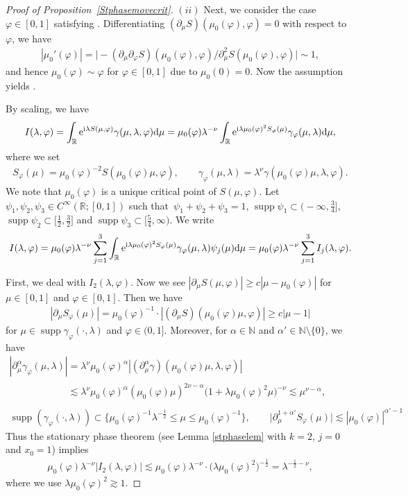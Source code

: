\documentclass[11pt]{article}
\numberwithin{equation}{section}
\def\R{\mathbb{R}}%
\DeclareMathOperator{\supp}{supp}%
\def\a{\alpha}
\def\c{\gamma}
\def\f{\varphi}
\def\g{\psi}
\def\l{\lambda}
\def\m{\mu}
\def\n{\nu}
\def\pa{\partial}
\begin{document}
\begin{proof}[Proof of Proposition~\ref{Stphasemovecrit}]
 $(ii)$ Next, we consider the case $\f\in [0,1]$ satisfying \smash{$\m_0(\f)\in \bigl[ 2^{-1}\l^{-\frac{1}{2}}, 1\bigr]$}.
Differentiating $(\pa_{\m}S)(\m_0(\f),\f)=0$ with respect to $\f$, we have
\begin{align*}
|\m_0'(\f)|=\bigl|-(\pa_{\m}\pa_{\f}S)(\m_0(\f),\f)/\pa_{\m}^2S(\m_0(\f),\f)\bigr|\sim 1,
\end{align*}
and hence $\m_0(\f)\sim \f$ for $\f\in [0,1]$ due to $\m_0(0)=0$. Now the assumption \smash{$\m_0(\f)\geq 2^{-1}\l^{-\frac{1}{2}}$} yields \smash{$\f\gtrsim \l^{-\frac{1}{2}}$}.

By scaling, we have
\begin{align*}
I(\l,\f)=\int_{\R}{\rm e}^{{\rm i}\l S(\m,\f)}\c(\m,\l,\f){\rm d}\m=\m_0(\f)\l^{-\n}\int_{\R}{\rm e}^{{\rm i}\l \m_0(\f)^2S_{\f}(\m)}\c_{\f}(\m,\l){\rm d}\m,
\end{align*}
where we set
\begin{align*}
S_{\f}(\m)=\m_0(\f)^{-2}S(\m_0(\f)\m,\f),\qquad \c_{\f}(\m,\l)=\l^{\n}\c(\m_0(\f)\m,\l,\f).
\end{align*}
We note that $\m_0(\f)$ is a unique critical point of $S(\m,\f)$.
Let $\g_1,\g_2,\g_3\in C^{\infty}(\R;[0,1])$ such that~${\g_1+\g_2+\g_3=1}$, $\supp \g_1\subset \bigl(-\infty,\frac{3}{4}\bigr]$, $\supp \g_2\subset \bigl[\frac{1}{2},\frac{3}{2}\bigr]$ and $\supp \g_3\subset \bigl[\frac{5}{4},\infty\bigr)$. We write
\begin{align*}
I(\l,\f)
=\m_0(\f)\l^{-\n}\sum_{j=1}^3\int_{\R}{\rm e}^{{\rm i}\l \m_0(\f)^2S_{\f}(\m)}\c_{\f}(\m,\l)\g_j(\m){\rm d}\m
=\m_0(\f)\l^{-\n}\sum_{j=1}^3I_j(\l,\f).
\end{align*}

First, we deal with $I_2(\l,\f)$.
Now we see $|\pa_{\m}S(\m,\f)|\geq c|\m-\m_0(\f)|$ for $\m\in [0,1]$ and $\f\in [0,1]$. Then we have
\begin{align*}
|\pa_{\m}S_{\f}(\m)|=\m_0(\f)^{-1}\cdot |(\pa_{\m}S)(\m_0(\f)\m,\f)|\geq c|\m-1|
\end{align*}
for $\m\in \supp \c_{\f}(\cdot,\l)$ and $\f\in (0,1]$.
Moreover, for $\a\in\mathbb{N}$ and $\a'\in \mathbb{N}\setminus\{0\}$, we have
\begin{gather*}
|\pa_{\m}^{\a}\c_{\f}(\m,\l)|=\l^{\n} \m_0(\f)^{\a}|(\pa_{\m}^{\a}\c)(\m_0(\f)\m,\l,\f)|\\
\phantom{|\pa_{\m}^{\a}\c_{\f}(\m,\l)|}{}\lesssim \l^{\n}\m_0(\f)^{\a} (\m_0(\f) \m)^{2\n-\a}\bigl(1+\l \m_0(\f)^2 \m\bigr)^{-\n}\lesssim \m^{\n-\a},\\
\supp (\c_{\f}(\cdot,\l))\subset \big\{\m_0(\f)^{-1}\l^{-\frac{1}{2}}\leq \m\leq \m_0(\f)^{-1}\big\},\qquad \big|\pa_{\m}^{1+\a'}S_{\f}(\m)\big|\lesssim |\m_0(\f)|^{\a'-1}
\end{gather*}
Thus the stationary phase theorem (see Lemma \ref{stphaselem} with $k=2$, $j=0$ and $x_0=1$) implies
\begin{align*}
\m_0(\f)\l^{-\n}|I_2(\l,\f)|
\lesssim \m_0(\f)\l^{-\n}\cdot \bigl(\l \m_0(\f)^2\bigr)^{-\frac{1}{2}}=\l^{-\frac{1}{2}-\n},
\end{align*}
where we use $\l \m_0(\f)^2\gtrsim 1$.


\end{proof}
\end{document}

